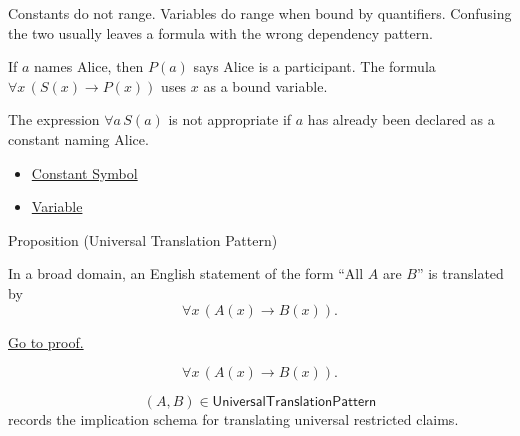 \begin{remark*}[Interpretation]
Constants do not range. Variables do range when bound by quantifiers. Confusing
the two usually leaves a formula with the wrong dependency pattern.
\end{remark*}

\begin{remark*}[Examples]
If \(a\) names Alice, then \(P(a)\) says Alice is a participant. The formula
\(\forall x\,(S(x)\to P(x))\) uses \(x\) as a bound variable.
\end{remark*}

\begin{remark*}
The expression \(\forall a\,S(a)\) is not appropriate if \(a\) has already been
declared as a constant naming Alice.
\end{remark*}

\begin{dependencies}
\begin{itemize}
  \item \hyperref[def:constant-symbol]{Constant Symbol}
  \item \hyperref[def:variable]{Variable}
\end{itemize}
\end{dependencies}

\begin{propositionbox}{Proposition (Universal Translation Pattern)}
\begin{proposition}
\label{prop:universal-translation-pattern}
In a broad domain, an English statement of the form ``All \(A\) are \(B\)''
is translated by
\[
\forall x\,(A(x)\to B(x)).
\]

\noindent\hyperref[prf:universal-translation-pattern]{Go to proof.}
\end{proposition}
\end{propositionbox}

\begin{remark*}
\[
\forall x\,(A(x)\to B(x)).
\]
\end{remark*}

\begin{remark*}
\[
  (A,B)\in\mathsf{UniversalTranslationPattern}
\] records the implication
schema for translating universal restricted claims.
\end{remark*}

